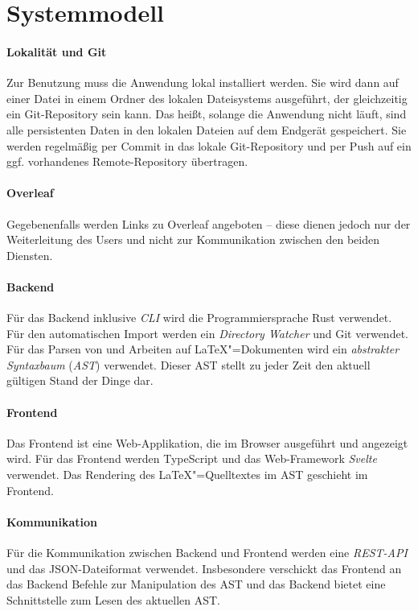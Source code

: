 \clearpage

\section{Systemmodell}
\label{sec:systemmodell}

\paragraph{Lokalität und Git}
Zur Benutzung muss die Anwendung lokal installiert werden.
Sie wird dann auf einer Datei in einem Ordner des lokalen Dateisystems ausgeführt,
der gleichzeitig ein Git-Repository sein kann.
Das heißt, solange die Anwendung nicht läuft, sind alle persistenten Daten in den lokalen Dateien auf dem Endgerät
gespeichert.
Sie werden regelmäßig per Commit in das lokale Git-Repository und per Push auf ein ggf. vorhandenes Remote-Repository
übertragen.

\paragraph{Overleaf}
Gegebenenfalls werden Links zu Overleaf angeboten --
diese dienen jedoch nur der Weiterleitung des Users und nicht zur Kommunikation zwischen den beiden Diensten.

\paragraph{Backend}
Für das Backend inklusive \textit{CLI} wird die Programmiersprache Rust verwendet.
Für den automatischen Import werden ein \textit{Directory Watcher} und Git verwendet.
Für das Parsen von und Arbeiten auf \LaTeX"=Dokumenten wird ein \textit{abstrakter Syntaxbaum} (\textit{AST})
verwendet.
Dieser AST stellt zu jeder Zeit den aktuell gültigen Stand der Dinge dar.

\paragraph{Frontend}
Das Frontend ist eine Web-Applikation, die im Browser ausgeführt und angezeigt wird.
Für das Frontend werden TypeScript und das Web-Framework \textit{Svelte} verwendet.
Das Rendering des \LaTeX"=Quelltextes im AST geschieht im Frontend.

\paragraph{Kommunikation}
Für die Kommunikation zwischen Backend und Frontend werden eine \textit{REST-API} und das JSON-Dateiformat
verwendet.
Insbesondere verschickt das Frontend an das Backend Befehle zur Manipulation des AST und
das Backend bietet eine Schnittstelle zum Lesen des aktuellen AST.
